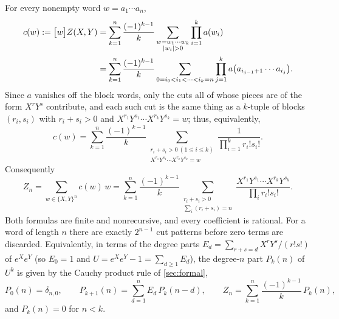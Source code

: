 \begin{theorem}\label{thm:wordcut}
For every nonempty word $w=a_1\cdots a_n$,
\begin{equation}\label{eq:wordcut}
\begin{aligned}
 c(w):=\coeff{w}Z(X,Y)
 &=\sum_{k=1}^{n}\frac{(-1)^{k-1}}{k}
   \sum_{\substack{w=w_1\cdots w_k\\|w_i|>0}}\prod_{i=1}^k a(w_i)\\
 &=\sum_{k=1}^{n}\frac{(-1)^{k-1}}{k}
   \sum_{0=i_0<i_1<\cdots<i_k=n}
   \prod_{j=1}^{k}a\bigl(a_{i_{j-1}+1}\cdots a_{i_j}\bigr).
\end{aligned}
\end{equation}
Since $a$ vanishes off the block words, only the cuts all of whose pieces
are of the form $X^rY^s$ contribute, and each such cut is the same thing as
a $k$-tuple of blocks $(r_i,s_i)$ with $r_i+s_i>0$ and
$X^{r_1}Y^{s_1}\cdots X^{r_k}Y^{s_k}=w$; thus, equivalently,
\begin{equation}\label{eq:wordblocks}
 c(w)=\sum_{k=1}^{n}\frac{(-1)^{k-1}}{k}
 \sum_{\substack{r_i+s_i>0\ (1\leq i\leq k)\\X^{r_1}Y^{s_1}\cdots X^{r_k}Y^{s_k}=w}}
 \frac1{\prod_{i=1}^kr_i!s_i!}.
\end{equation}
Consequently
\begin{equation}\label{eq:homblocks}
 Z_n=\sum_{w\in\{X,Y\}^n}c(w)\,w
 =\sum_{k=1}^{n}\frac{(-1)^{k-1}}{k}
 \sum_{\substack{r_i+s_i>0\\\sum_i(r_i+s_i)=n}}
 \frac{X^{r_1}Y^{s_1}\cdots X^{r_k}Y^{s_k}}
 {\prod_i r_i!s_i!}.
\end{equation}
Both formulas are finite and nonrecursive, and every coefficient is rational.
For a word of length $n$ there are exactly $2^{n-1}$ cut patterns before zero
terms are discarded. Equivalently, in terms of the degree parts
$E_d=\sum_{r+s=d}X^rY^s/(r!s!)$ of $e^Xe^Y$ (so $E_0=1$ and
$U=e^Xe^Y-1=\sum_{d\geq1}E_d$), the degree-$n$ part $P_k(n)$ of $U^k$ is
given by the Cauchy product rule of \cref{sec:formal},
\begin{equation}\label{eq:degreerec}
 P_0(n)=\delta_{n,0},\qquad
 P_{k+1}(n)=\sum_{d=1}^{n}E_d\,P_k(n-d),\qquad
 Z_n=\sum_{k=1}^{n}\frac{(-1)^{k-1}}{k}\,P_k(n),
\end{equation}
and $P_k(n)=0$ for $n<k$.
\end{theorem}
